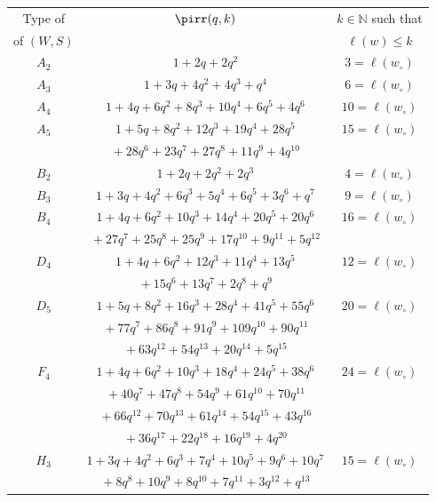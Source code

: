 \documentclass[ALCO,Unicode]{cedram}
\theoremstyle{definition}
\begin{document}
\begin{table}
\renewcommand\arraystretch{1.25}
\begin{center} 
\begin{tabular}{|c|c|c|}
\hline
Type of   &   $\pirr(q,k)$   & $k\in\mathbb N$ such that  \\
of $(W,S)$  & $ $   &$\ell(w)\leq k$  \\
  \hline \hline
  $A_2$& $1+2q+2q^2$&$3=\ell(w_\circ)$\\
  \hline
  $A_3$& $1 + 3q + 4q^2 + 4q^3 + q^4$&$6=\ell(w_\circ)$\\
  \hline
  $A_4$& $1 + 4q + 6q^2 + 8q^3 + 10q^4 + 6q^5 + 4q^6$&$10=\ell(w_\circ)$\\
    \hline
  $A_5$& $1 + 5q + 8q^2 + 12q^3 + 19q^4 + 28q^5 $&$15=\ell(w_\circ)$\\
  &${}+ 28q^6 + 23q^7 + 27q^8 + 11q^9 + 4q^{10}$& \\
 \hline
  $B_2$& $1 + 2q + 2q^2 + 2q^3 $&$4=\ell(w_\circ)$\\ 
   \hline
  $B_3$& $1 + 3q + 4q^2 + 6q^3 + 5q^4 + 6q^5 + 3q^6 + q^7 $&$9=\ell(w_\circ)$\\ 
   \hline
  $B_4$& $1 + 4q + 6q^2 + 10q^3 + 14q^4 + 20q^5 + 20q^6  $&$16=\ell(w_\circ)$\\ 
    &${}+ 27q^7 + 25q^8 + 25q^9 + 17q^{10} + 9q^{11} + 5q^{12}$& \\
     \hline
  $D_4$& $1 + 4q + 6q^2 + 12q^3 + 11q^4 + 13q^5 $&$12=\ell(w_\circ)$\\
       &${}+ 15q^6 + 13q^7 + 2q^8 + q^9$& \\
    \hline
  $D_5$& $ 1 + 5q + 8q^2 + 16q^3 + 28q^4 + 41q^5 + 55q^6  $&$20=\ell(w_\circ)$\\
       &${}+ 77q^7 + 86q^8 + 91q^9+ 109q^{10} + 90q^{11}  $& \\
       &${}+ 63q^{12} + 54q^{13} + 20q^{14} + 5q^{15} $& \\
 \hline
  $F_4$& $ 1 + 4q + 6q^2 + 10q^3 + 18q^4 + 24q^5 + 38q^6   $&$24=\ell(w_\circ)$\\
       &${} + 40q^7 + 47q^8+ 54q^9 + 61q^{10} + 70q^{11}  $& \\
       &${}+ 66q^{12} + 70q^{13} + 61q^{14} + 54q^{15} + 43q^{16} $& \\
       &${} + 36q^{17} + 22q^{18} + 16q^{19} + 4q^{20} $& \\
 \hline
  $H_3$& $1 + 3q + 4q^2 + 6q^3 + 7q^4 + 10q^5 + 9q^6 + 10q^7  $&$15=\ell(w_\circ)$\\ 
    &${}+ 8q^8 + 10q^9 + 8q^{10} + 7q^{11} + 3q^{12} + q^{13}$& \\

\end{tabular}
\end{center}
\end{table}
\end{document}
